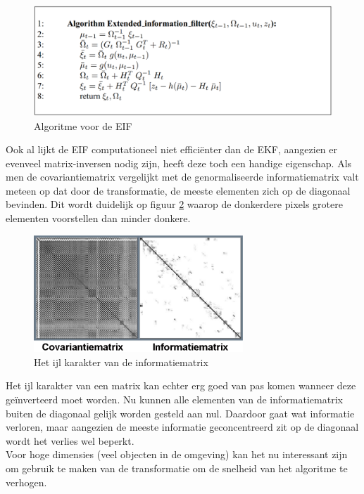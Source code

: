\documentclass{book}
\begin{document}
\begin{figure}[h!]
	\centering
	\includegraphics[width = \textwidth]{extinf}
	\caption{Algoritme voor de EIF \cite{Proballistic}}
	\label{extinf}
\end{figure}
Ook al lijkt de EIF computationeel niet efficiënter dan de EKF, aangezien er evenveel matrix-inversen nodig zijn, heeft deze toch een handige eigenschap. Als men de covariantiematrix vergelijkt met de genormaliseerde informatiematrix valt meteen op dat door de transformatie, de meeste elementen zich op de diagonaal bevinden. Dit wordt duidelijk op figuur \ref{sparse} waarop de donkerdere pixels grotere elementen voorstellen dan minder donkere. 

\begin{figure}[h!]
	\centering
	\includegraphics[width = 0.7\textwidth]{sparse}
	\caption{Het ijl karakter van de informatiematrix \cite{Course}}
	\label{sparse}
\end{figure}

Het ijl karakter van een matrix kan echter erg goed van pas komen wanneer deze geïnverteerd moet worden. Nu kunnen alle elementen van de informatiematrix buiten de diagonaal gelijk worden gesteld aan nul. Daardoor gaat wat informatie verloren, maar aangezien de meeste informatie geconcentreerd zit op de diagonaal wordt het verlies wel beperkt.\\
Voor hoge dimensies (veel objecten in de omgeving) kan het nu interessant zijn om gebruik te maken van de transformatie om de snelheid van het algoritme te verhogen.
\end{document}
